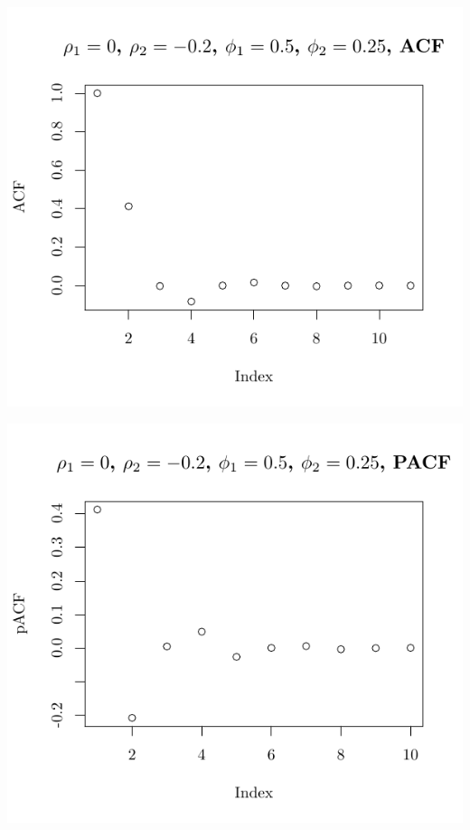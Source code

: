 \documentclass[10pt]{paper}\usepackage[]{graphicx}\usepackage[]{color}
\makeatletter
\def\maxwidth{ %
  \ifdim\Gin@nat@width>\linewidth
    \linewidth
  \else
    \Gin@nat@width
  \fi
}
\newenvironment{knitrout}{}{} %
\makeatother
\begin{document}
\begin{knitrout}
{\centering \includegraphics[width=\maxwidth]{figure/graphics-plotter-79} 

}




{\centering \includegraphics[width=\maxwidth]{figure/graphics-plotter-80} 

}





\end{knitrout}
\end{document}
